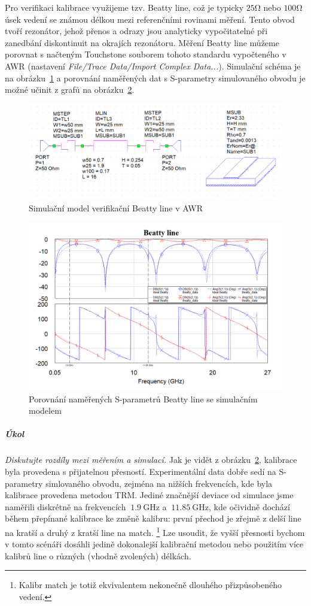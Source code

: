 \documentclass[11pt,a4paper]{article}
\newcommand{\Ohm}{\mathrm{\Omega}}
\newcommand{\GHz}{\mathrm{GHz}}
\begin{document}
Pro verifikaci kalibrace využijeme tzv. Beatty line, což je typicky $25\Ohm$ nebo $100\Ohm$ úsek vedení se známou délkou mezi referenčními rovinami měření. Tento obvod tvoří rezonátor, jehož přenos a odrazy jsou analyticky vypočitatelné při zanedbání diskontinuit na okrajích rezonátoru. Měření Beatty line můžeme porovnat s načteným Touchstone souborem tohoto standardu vypočteného v AWR (nastavení \emph{File/Trace Data/Import Complex Data...}). Simulační schéma je na obrázku~\ref{fig:beatty-line-awr} a porovnání naměřených dat s S-parametry simulovaného obvodu je možné učinit z grafů na obrázku~\ref{fig:beatty-line}.
\begin{figure}[!ht]
    \centering
    \includegraphics[width=.8\textwidth]{src/beatty-line-awr.png}
    \caption{\label{fig:beatty-line-awr}Simulační model verifikační Beatty line v AWR}
\end{figure}
\begin{figure}[!ht]
    \centering
    \includegraphics[width=.9\textwidth]{src/beatty-line.png}
    \caption{\label{fig:beatty-line}Porovnání naměřených S-parametrů Beatty line se simulačním modelem}
\end{figure}
\subparagraph*{Úkol} \emph{Diskutujte rozdíly mezi měřením a simulací.} Jak je vidět z obrázku~\ref{fig:beatty-line}, kalibrace byla provedena s přijatelnou přesností. Experimentální data dobře sedí na S-parametry simlovaného obvodu, zejména na nižších frekvencích, kde byla kalibrace provedena metodou TRM. Jediné značnější deviace od simulace jsme naměřili diskrétně na frekvencích $~1.9\ \GHz$ a $~11.85\ \GHz$, kde očividně dochází během přepínané kalibrace ke změně kalibru: první přechod je zřejmě z delší line na kratší a druhý z kratší line na match.%
    \footnote{Kalibr match je totiž ekvivalentem nekonečně dlouhého přizpůsobeného vedení.}
Lze usoudit, že vyšší přesnosti bychom v tomto scénáři dosáhli jedině dokonalejší kalibrační metodou nebo použitím více kalibrů line o různých (vhodně zvolených) délkách.
\end{document}
